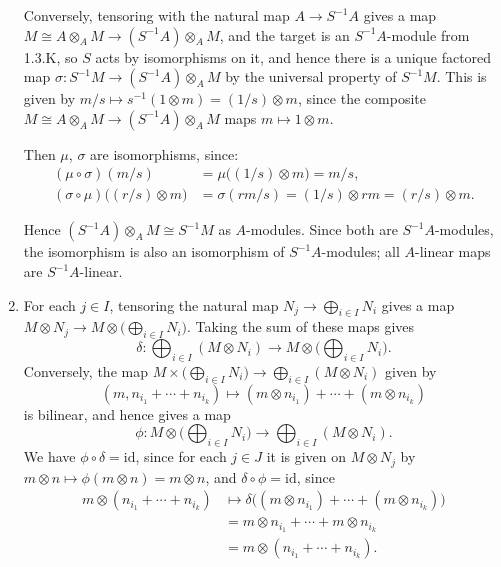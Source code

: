 \documentclass{report}
\newcommand{\id}{{\mathrm{id}}} %
\begin{document}
\begin{enumerate}[label=\textbf{1.3.\Alph*.}]
	      Conversely, tensoring with the natural map $A\to S^{-1}A$ gives a
	      map $M\cong A\otimes_AM\to(S^{-1}A)\otimes_AM$, and the target is an
	      $S^{-1}A$-module from 1.3.K, so $S$ acts by isomorphisms on it,
	      and hence there is a unique factored map
	      $\sigma:S^{-1}M\to(S^{-1}A)\otimes_AM$ by the universal property of
	      $S^{-1}M$. This is given by
	      $m/s\mapsto s^{-1}(1\otimes m)=(1/s)\otimes m$, since the composite
	      $M\cong A\otimes_AM\to(S^{-1}A)\otimes_AM$ maps $m\mapsto1\otimes m$.

	      Then $\mu$, $\sigma$ are isomorphisms, since:
	      \begin{align*}
		      (\mu\circ\sigma)(m/s)
		       & = \mu\bigl((1/s)\otimes m\bigr)
		      = m/s,                             \\
		      (\sigma\circ\mu)\bigl((r/s)\otimes m\bigr)
		       & = \sigma(rm/s)
		      = (1/s)\otimes rm
		      = (r/s)\otimes m.
	      \end{align*}

	      Hence $(S^{-1}A)\otimes_AM\cong S^{-1}M$ as $A$-modules. Since both
	      are $S^{-1}A$-modules, the isomorphism is also an isomorphism of
	      $S^{-1}A$-modules; all $A$-linear maps are $S^{-1}A$-linear.

	\item For each $j\in I$, tensoring the natural map
	      $N_j\to\bigoplus_{i\in I}N_i$ gives a map
	      $M\otimes N_j\to M\otimes\bigl(\bigoplus_{i\in I}N_i\bigr)$. Taking
	      the sum of these maps gives
	      \begin{equation*}
		      \delta : \bigoplus_{i\in I}\left(M\otimes N_i\right)
		      \to M\otimes\bigl(\bigoplus_{i\in I}N_i\bigr).
	      \end{equation*}
	      Conversely, the map
	      $M\times\bigl(\bigoplus_{i\in I}N_i\bigr)\to\bigoplus_{i\in I}\left(M\otimes N_i\right)$
	      given by
	      \begin{equation*}
		      (m,n_{i_1}+\cdots+n_{i_k})
		      \mapsto (m\otimes n_{i_1}) + \cdots + (m\otimes n_{i_k})
	      \end{equation*}
	      is bilinear, and hence gives a map
	      \begin{equation*}
		      \phi : M\otimes\bigl(\bigoplus_{i\in I}N_i\bigr)
		      \to \bigoplus_{i\in I}\left(M\otimes N_i\right).
	      \end{equation*}
	      We have $\phi\circ\delta=\id$, since for each $j\in J$ it is given
	      on $M\otimes N_j$ by $m\otimes n\mapsto\phi(m\otimes n)=m\otimes n$,
	      and $\delta\circ\phi=\id$, since
	      \begin{align*}
		      m\otimes(n_{i_1}+\cdots+n_{i_k})
		       & \mapsto \delta\bigl((m\otimes n_{i_1})+\cdots
		      +(m\otimes n_{i_k})\bigr)                        \\
		       & = m\otimes n_{i_1} +\cdots
		      + m\otimes n_{i_k}                               \\
		       & = m\otimes(n_{i_1}+\cdots+n_{i_k}).
	      \end{align*}


\end{enumerate}
\end{document}
